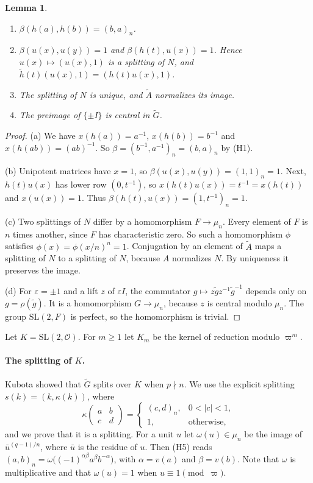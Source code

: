 \documentclass[12pt,letterpaper]{article}
\numberwithin{equation}{section}
\theoremstyle{plain}
\newtheorem{lemma}[theorem]{Lemma}
\theoremstyle{definition}
\theoremstyle{remark}
\newcommand{\Gt}{\widetilde G}
\newcommand{\At}{\widetilde A}
\newcommand{\hl}{\tilde h}
\newcommand{\Of}{\mathcal O}
\newcommand{\SL}{\mathrm{SL}}
\begin{document}
\begin{lemma}\label{lem:cocycle}
\begin{enumerate}[label=(\alph*)]
\item $\beta(h(a),h(b))=(b,a)_n$.
\item $\beta(u(x),u(y))=1$ and $\beta(h(t),u(x))=1$. Hence
  $u(x)\mapsto(u(x),1)$ is a splitting of $N$, and
  $\hl(t)(u(x),1)=(h(t)u(x),1)$.
\item The splitting of $N$ is unique, and $\At$ normalizes its image.
\item The preimage of $\{\pm I\}$ is central in $\Gt$.
\end{enumerate}
\end{lemma}

\begin{proof}
(a) We have $x(h(a))=a^{-1}$, $x(h(b))=b^{-1}$ and
$x(h(ab))=(ab)^{-1}$. So $\beta=(b^{-1},a^{-1})_n=(b,a)_n$ by (H1).

(b) Unipotent matrices have $x=1$, so $\beta(u(x),u(y))=(1,1)_n=1$.
Next, $h(t)u(x)$ has lower row $(0,t^{-1})$, so
$x(h(t)u(x))=t^{-1}=x(h(t))$ and $x(u(x))=1$. Thus
$\beta(h(t),u(x))=(1,t^{-1})_n=1$.

(c) Two splittings of $N$ differ by a homomorphism $F\to\mu_n$. Every
element of $F$ is $n$ times another, since $F$ has characteristic
zero. So such a homomorphism $\phi$ satisfies
$\phi(x)=\phi(x/n)^n=1$. Conjugation by an element of $\At$ maps a
splitting of $N$ to a splitting of $N$, because $A$ normalizes $N$. By
uniqueness it preserves the image.

(d) For $\varepsilon=\pm1$ and a lift $z$ of $\varepsilon I$, the
commutator $g\mapsto z\tilde g z^{-1}\tilde g^{-1}$ depends only on
$g=\rho(\tilde g)$. It is a homomorphism $G\to\mu_n$, because $z$ is
central modulo $\mu_n$. The group $\SL(2,F)$ is perfect, so the
homomorphism is trivial.
\end{proof}

Let $K=\SL(2,\Of)$. For $m\ge1$ let $K_m$ be the kernel of reduction
modulo $\varpi^m$.

\paragraph{The splitting of $K$.} Kubota \cite{Ku67} showed that $\Gt$
splits over $K$ when $p\nmid n$. We use the explicit splitting
$s(k)=(k,\kappa(k))$, where
\begin{equation}\label{eq:kappa}
\kappa\begin{pmatrix}a&b\\c&d\end{pmatrix}=
\begin{cases}(c,d)_n,&0<|c|<1,\\ 1,&\text{otherwise,}\end{cases}
\end{equation}
and we prove that it is a splitting. For a unit $u$ let
$\omega(u)\in\mu_n$ be the image of $\bar u^{(q-1)/n}$, where $\bar u$ is
the residue of $u$. Then (H5) reads
$(a,b)_n=\omega\bigl((-1)^{\alpha\beta}a^\beta b^{-\alpha}\bigr)$, with
$\alpha=v(a)$ and $\beta=v(b)$. Note that $\omega$ is multiplicative and
that $\omega(u)=1$ when $u\equiv1\pmod\varpi$.
\end{document}
